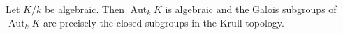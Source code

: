 Let $K/k$ be algebraic. Then $\operatorname{Aut}_k K$ is algebraic and the Galois subgroups of $\operatorname{Aut}_k K$ are precisely the closed subgroups in the Krull topology.
